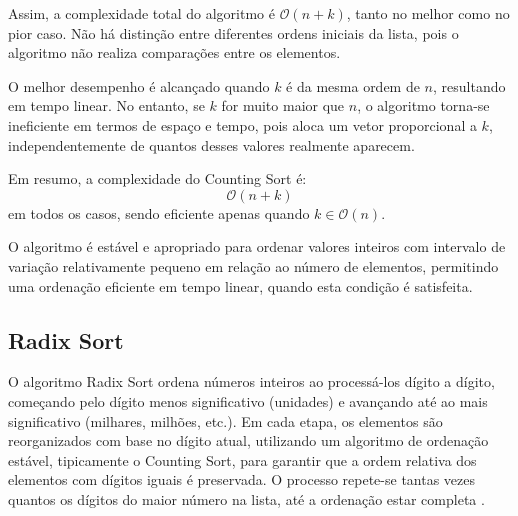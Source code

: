 \documentclass[conference]{IEEEtran}
\begin{document}
Assim, a complexidade total do algoritmo é \(\mathcal{O}(n + k)\), tanto no melhor como no pior caso. Não há distinção entre diferentes ordens iniciais da lista, pois o algoritmo não realiza comparações entre os elementos.

O melhor desempenho é alcançado quando \( k \) é da mesma ordem de \( n \), resultando em tempo linear. No entanto, se \( k \) for muito maior que \( n \), o algoritmo torna-se ineficiente em termos de espaço e tempo, pois aloca um vetor proporcional a \( k \), independentemente de quantos desses valores realmente aparecem.

Em resumo, a complexidade do Counting Sort é:
\[
\mathcal{O}(n + k)
\]
em todos os casos, sendo eficiente apenas quando \( k \in \mathcal{O}(n) \).

O algoritmo é estável e apropriado para ordenar valores inteiros com intervalo de variação relativamente pequeno em relação ao número de elementos, permitindo uma ordenação eficiente em tempo linear, quando esta condição é satisfeita.

\subsection{Radix Sort}

O algoritmo Radix Sort ordena números inteiros ao processá-los dígito a dígito, começando pelo dígito menos significativo (unidades) e avançando até ao mais significativo (milhares, milhões, etc.). Em cada etapa, os elementos são reorganizados com base no dígito atual, utilizando um algoritmo de ordenação estável, tipicamente o Counting Sort, para garantir que a ordem relativa dos elementos com dígitos iguais é preservada. O processo repete-se tantas vezes quantos os dígitos do maior número na lista, até a ordenação estar completa \cite{obeya2019parallel}.
\end{document}
